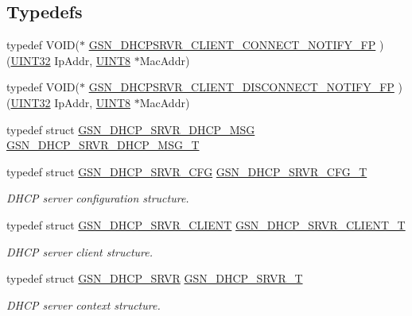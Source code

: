 \subsection*{Typedefs}
\begin{DoxyCompactItemize}
\item 
typedef VOID($\ast$ \hyperlink{a00482_a4e4c9cdf544b20379a6322b6f2466dd2}{GSN\_\-DHCPSRVR\_\-CLIENT\_\-CONNECT\_\-NOTIFY\_\-FP} )(\hyperlink{a00660_gae1e6edbbc26d6fbc71a90190d0266018}{UINT32} IpAddr, \hyperlink{a00660_gab27e9918b538ce9d8ca692479b375b6a}{UINT8} $\ast$MacAddr)
\item 
typedef VOID($\ast$ \hyperlink{a00482_a05462468438cc4b6c8ec15d1a0cdecb6}{GSN\_\-DHCPSRVR\_\-CLIENT\_\-DISCONNECT\_\-NOTIFY\_\-FP} )(\hyperlink{a00660_gae1e6edbbc26d6fbc71a90190d0266018}{UINT32} IpAddr, \hyperlink{a00660_gab27e9918b538ce9d8ca692479b375b6a}{UINT8} $\ast$MacAddr)
\item 
typedef struct \hyperlink{a00046}{GSN\_\-DHCP\_\-SRVR\_\-DHCP\_\-MSG} \hyperlink{a00482_aeaa3dc7848019559e3dae3a916ff5608}{GSN\_\-DHCP\_\-SRVR\_\-DHCP\_\-MSG\_\-T}
\item 
typedef struct \hyperlink{a00044}{GSN\_\-DHCP\_\-SRVR\_\-CFG} \hyperlink{a00661_ga5a69af0df29b0dc56441470a22cf3ab3}{GSN\_\-DHCP\_\-SRVR\_\-CFG\_\-T}
\begin{DoxyCompactList}\small\item\em DHCP server configuration structure. \end{DoxyCompactList}\item 
typedef struct \hyperlink{a00045}{GSN\_\-DHCP\_\-SRVR\_\-CLIENT} \hyperlink{a00661_ga54a36c901a1b4f316e5202de8b35def8}{GSN\_\-DHCP\_\-SRVR\_\-CLIENT\_\-T}
\begin{DoxyCompactList}\small\item\em DHCP server client structure. \end{DoxyCompactList}\item 
typedef struct \hyperlink{a00043}{GSN\_\-DHCP\_\-SRVR} \hyperlink{a00661_ga894396f4b78d0bb4bd07286f4004fe8f}{GSN\_\-DHCP\_\-SRVR\_\-T}
\begin{DoxyCompactList}\small\item\em DHCP server context structure. \end{DoxyCompactList}\end{DoxyCompactItemize}
